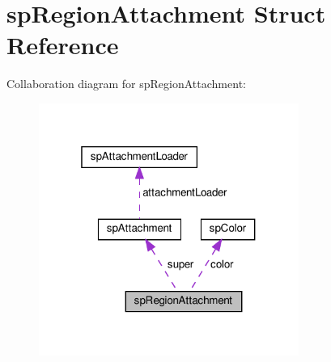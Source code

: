 \hypertarget{structspRegionAttachment}{}\section{sp\+Region\+Attachment Struct Reference}
\label{structspRegionAttachment}


Collaboration diagram for sp\+Region\+Attachment\+:
\nopagebreak
\begin{figure}[H]
\begin{center}
\leavevmode
\includegraphics[width=241pt]{structspRegionAttachment__coll__graph}
\end{center}
\end{figure}
